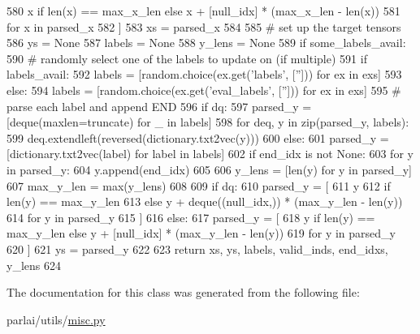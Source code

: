 \begin{DoxyCode}
580                 x \textcolor{keywordflow}{if} len(x) == max\_x\_len \textcolor{keywordflow}{else} x + [null\_idx] * (max\_x\_len - len(x))
581                 \textcolor{keywordflow}{for} x \textcolor{keywordflow}{in} parsed\_x
582             ]
583         xs = parsed\_x
584 
585         \textcolor{comment}{# set up the target tensors}
586         ys = \textcolor{keywordtype}{None}
587         labels = \textcolor{keywordtype}{None}
588         y\_lens = \textcolor{keywordtype}{None}
589         \textcolor{keywordflow}{if} some\_labels\_avail:
590             \textcolor{comment}{# randomly select one of the labels to update on (if multiple)}
591             \textcolor{keywordflow}{if} labels\_avail:
592                 labels = [random.choice(ex.get(\textcolor{stringliteral}{'labels'}, [\textcolor{stringliteral}{''}])) \textcolor{keywordflow}{for} ex \textcolor{keywordflow}{in} exs]
593             \textcolor{keywordflow}{else}:
594                 labels = [random.choice(ex.get(\textcolor{stringliteral}{'eval\_labels'}, [\textcolor{stringliteral}{''}])) \textcolor{keywordflow}{for} ex \textcolor{keywordflow}{in} exs]
595             \textcolor{comment}{# parse each label and append END}
596             \textcolor{keywordflow}{if} dq:
597                 parsed\_y = [deque(maxlen=truncate) \textcolor{keywordflow}{for} \_ \textcolor{keywordflow}{in} labels]
598                 \textcolor{keywordflow}{for} deq, y \textcolor{keywordflow}{in} zip(parsed\_y, labels):
599                     deq.extendleft(reversed(dictionary.txt2vec(y)))
600             \textcolor{keywordflow}{else}:
601                 parsed\_y = [dictionary.txt2vec(label) \textcolor{keywordflow}{for} label \textcolor{keywordflow}{in} labels]
602             \textcolor{keywordflow}{if} end\_idx \textcolor{keywordflow}{is} \textcolor{keywordflow}{not} \textcolor{keywordtype}{None}:
603                 \textcolor{keywordflow}{for} y \textcolor{keywordflow}{in} parsed\_y:
604                     y.append(end\_idx)
605 
606             y\_lens = [len(y) \textcolor{keywordflow}{for} y \textcolor{keywordflow}{in} parsed\_y]
607             max\_y\_len = max(y\_lens)
608 
609             \textcolor{keywordflow}{if} dq:
610                 parsed\_y = [
611                     y
612                     \textcolor{keywordflow}{if} len(y) == max\_y\_len
613                     \textcolor{keywordflow}{else} y + deque((null\_idx,)) * (max\_y\_len - len(y))
614                     \textcolor{keywordflow}{for} y \textcolor{keywordflow}{in} parsed\_y
615                 ]
616             \textcolor{keywordflow}{else}:
617                 parsed\_y = [
618                     y \textcolor{keywordflow}{if} len(y) == max\_y\_len \textcolor{keywordflow}{else} y + [null\_idx] * (max\_y\_len - len(y))
619                     \textcolor{keywordflow}{for} y \textcolor{keywordflow}{in} parsed\_y
620                 ]
621             ys = parsed\_y
622 
623         \textcolor{keywordflow}{return} xs, ys, labels, valid\_inds, end\_idxs, y\_lens
624 
\end{DoxyCode}


The documentation for this class was generated from the following file\+:\begin{DoxyCompactItemize}
\item 
parlai/utils/\hyperlink{misc_8py}{misc.\+py}\end{DoxyCompactItemize}
